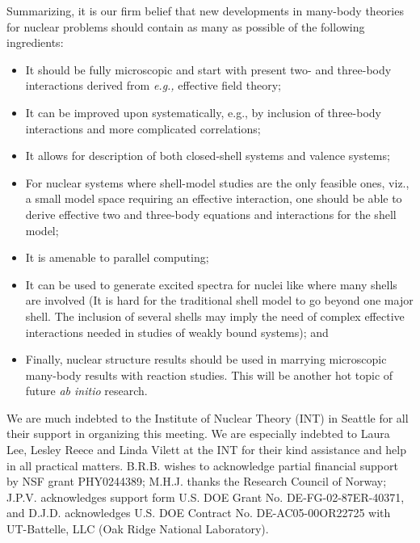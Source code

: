 \documentclass[12pt]{iopart}
\begin{document}
Summarizing, it is our firm belief 
that new developments in many-body theories
for nuclear problems should contain as many as possible of the 
following ingredients:
\begin{itemize}
\item
It should be fully microscopic and start with present two- and three-body
interactions derived from {\it e.g.,} effective field theory;
\item It can be improved upon systematically, e.g., by inclusion of
three-body interactions and more complicated correlations;
\item It allows for description of both closed-shell 
systems and valence systems;
\item For nuclear systems where shell-model studies are the only feasible ones,
viz., a small model space requiring an effective interaction, 
one should be able to
derive  effective two and three-body 
equations and interactions for the shell
model;
\item It is amenable to parallel computing;
\item It can be used to generate excited spectra for nuclei like 
where many shells are involved (It is hard for the traditional shell model
to go beyond one major shell.  The inclusion of several shells may imply 
the need of  complex effective interactions
needed in studies of weakly bound systems); and
\item Finally, nuclear structure results should be used in marrying microscopic 
many-body results with reaction studies. This will be another hot topic
of future {\it ab initio} research.
\end{itemize}


\ack
We are much indebted to the Institute of Nuclear Theory (INT) in Seattle for 
all their support
in organizing this meeting. We are especially indebted 
to Laura Lee, Lesley Reece and Linda Vilett at the INT for their 
kind assistance and help in all practical matters. 
B.R.B. wishes to acknowledge partial financial support by NSF grant
PHY0244389; M.H.J. thanks the Research Council of Norway; J.P.V. 
acknowledges support form U.S. DOE Grant No. DE-FG-02-87ER-40371, and 
D.J.D. acknowledges U.S. DOE Contract No. DE-AC05-00OR22725 with UT-Battelle,
LLC (Oak Ridge National Laboratory). 
\end{document}
